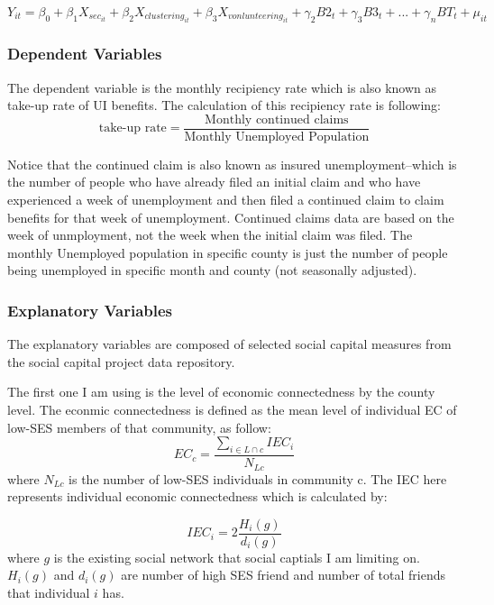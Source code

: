 \documentclass{article}
\begin{document}
$Y_{it}=\beta_0+\beta_1 X_{sec_{it}}+\beta_2 X_{clustering_{it}}+\beta_3 X_{vonlunteering_{it}}+\gamma_2 B2_t+\gamma_3 B3_t +...+\gamma_n BT_t+\mu_{it}$

\subsubsection{Dependent Variables}


The dependent variable is the monthly recipiency rate which is also known as take-up rate of UI benefits. The calculation of this recipiency rate is following: $$\text{take-up rate}=\frac{\text{Monthly continued claims}}{\text{Monthly Unemployed Population}}$$

Notice that the continued claim is also known as insured unemployment--which is the number of people who have already filed an initial claim and who have experienced a week of unemployment and then filed a continued claim to claim benefits for that week of unemployment. Continued claims data are based on the week of unmployment, not the week when the initial claim was filed. The monthly Unemployed population in specific county is just the number of people being unemployed in specific month and county (not seasonally adjusted).

\subsubsection{Explanatory Variables}

The explanatory variables are composed of selected social capital measures from the social capital project data repository.

The first one I am using is the level of economic connectedness by the county level. The econmic connectedness is defined as the mean level of individual EC of low-SES members of that community, as follow: $$EC_c=\frac{\sum_{i\in L \cap c}{IEC_i}}{N_{Lc}}$$ where $N_{Lc}$ is the number of low-SES individuals in community c. The IEC here represents individual economic connectedness which is calculated by:

$$IEC_i=2\frac{H_i(g)}{d_i(g)}$$ where $g$ is the existing social network that social captials I am limiting on. $H_i(g)$ and $d_i(g)$ are number of high SES friend and number of total friends that individual $i$ has.
\end{document}
